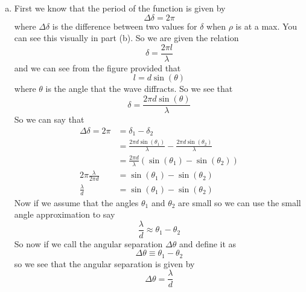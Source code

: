 \documentclass[11pt]{article}
\numberwithin{equation}{section}
\begin{document}
\begin{enumerate}[(a)]
\item
First we know that the period of the function is given by
$$\Delta\delta = 2\pi$$
where $\Delta\delta$ is the difference between two values for $\delta$ when $\rho$ is at a max. You can see this visually in part (b). So we are given the relation
$$\delta = \frac{2\pi l}{\lambda}$$
and we can see from the figure provided that 
$$l = d\sin(\theta)$$ 
where $\theta$ is the angle that the wave diffracts. So we see that
$$\delta = \frac{2\pi d\sin(\theta)}{\lambda}$$
So we can say that
\begin{align*}
\Delta\delta = 2\pi &= \delta_1-\delta_2\\
&= \frac{2\pi d\sin(\theta_1)}{\lambda} - \frac{2\pi d\sin(\theta_2)}{\lambda}\\
&= \frac{2\pi d}{\lambda}(\sin(\theta_1) - \sin(\theta_2))\\
2\pi\frac{\lambda}{2\pi d} &= \sin(\theta_1) - \sin(\theta_2)\\
\frac{\lambda}{d} &= \sin(\theta_1) - \sin(\theta_2)
\end{align*}
Now if we assume that the angles $\theta_1$ and $\theta_2$ are small so we can use the small angle approximation to say
$$\frac{\lambda}{d} \approx \theta_1 - \theta_2$$
So now if we call the angular separation $\Delta\theta$ and define it as
$$\Delta\theta \equiv \theta_1 - \theta_2$$
so we see that the angular separation is given by
$$\Delta\theta = \frac{\lambda}{d}$$ 
\end{enumerate}
\end{document}
